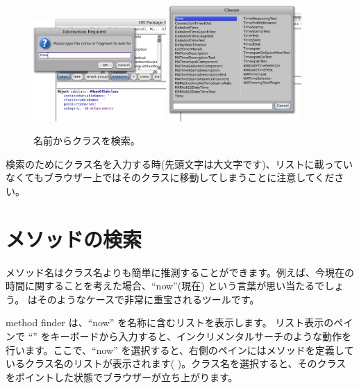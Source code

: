 \documentclass[a4paper,10pt,twoside]{book}
\begin{document}
\begin{figure}[hbt]
\centerline{
	\includegraphics[width=0.45\textwidth]{FindIt}
	\hspace{1cm}
	\includegraphics[width=0.45\textwidth]{TimeClasses}
}
\caption{名前からクラスを検索。
}
\end{figure}

検索のためにクラス名を入力する時(先頭文字は大文字です)、リストに載っていなくてもブラウザー上ではそのクラスに移動してしまうことに注意してください。

\section{メソッドの検索}

メソッド名はクラス名よりも簡単に推測することができます。例えば、今現在の時間に関することを考えた場合、``now''(現在) という言葉が思い当たるでしょう。
 はそのようなケースで非常に重宝されるツールです。

method finder は、``now'' を名称に含むリストを表示します。
リスト表示のペインで ``'' をキーボードから入力すると、インクリメンタルサーチのような動作を行います。ここで、``now'' を選択すると、右側のペインにはメソッドを定義しているクラス名のリストが表示されます( )。クラス名を選択すると、そのクラスをポイントした状態でブラウザーが立ち上がります。
\end{document}
